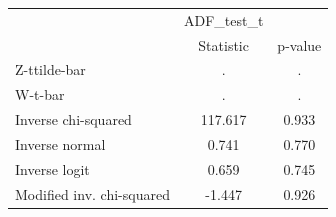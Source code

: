 \begin{tabular}{l*{2}{c}}
\hline\hline
            &  ADF\_test\_t&            \\
            &   Statistic&     p-value\\
\hline
Z-ttilde-bar&           .&           .\\
W-t-bar     &           .&           .\\
Inverse chi-squared&     117.617&       0.933\\
Inverse normal&       0.741&       0.770\\
Inverse logit&       0.659&       0.745\\
Modified inv. chi-squared&      -1.447&       0.926\\
\hline\hline
\end{tabular}
